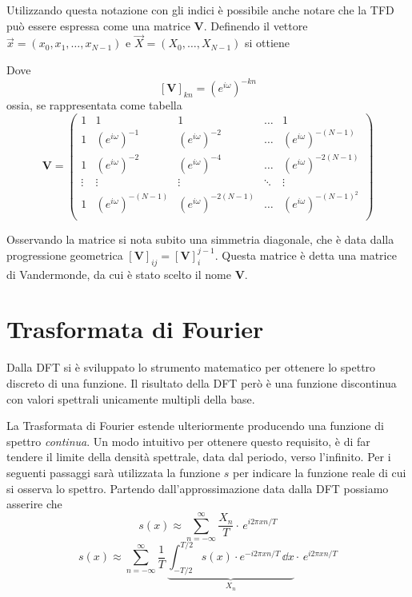 \noindent\fbox{\begin{minipage}{\textwidth}\[
    X_k = c_k \cdot T = \sum_{n=0}^{N-1} x_n\cdot e^{-i\omega kn}
\]\end{minipage}}

Utilizzando questa notazione con gli indici \`e possibile anche notare che la
TFD pu\`o essere espressa come una matrice \(\mathbf{V}\). Definendo il vettore
\(\vec{x} = (x_0,x_1,\dots,x_{N-1})\) e \(\vec{X} = (X_0,\dots,X_{N-1})\) si ottiene

\noindent\fbox{\begin{minipage}{\textwidth}\[
    \vec{X} = \mathbf{V}\cdot\vec{x}
    \vspace{2mm}
\]\end{minipage}}

\noindent Dove 
\[
    [\mathbf{V}]_{kn} = (e^{i\omega})^{-kn}
\]
ossia, se rappresentata come tabella
\[
    \mathbf{V} = 
    \begin{pmatrix}
    1      & 1                      & 1                       & \dots  & 1                        \\[1em]
    1      & (e^{i\omega})^{-1}     & (e^{i\omega})^{-2}      & \dots  & (e^{i\omega})^{-(N-1)}   \\[1em]
    1      & (e^{i\omega})^{-2}     & (e^{i\omega})^{-4}      & \dots  & (e^{i\omega})^{-2(N-1)}  \\[1em]
    \vdots & \vdots                 &  \vdots                 & \ddots & \vdots                   \\[1em]
    1      & (e^{i\omega})^{-(N-1)} & (e^{i\omega})^{-2(N-1)} & \dots  & (e^{i\omega})^{-(N-1)^2} \\[1em]
    \end{pmatrix}
\]

Osservando la matrice si nota subito una simmetria diagonale, che \`e data
dalla  progressione geometrica \([\mathbf{V}]_{ij} = [\mathbf{V}]_i^{j-1}\).
Questa matrice \`e detta una matrice di Vandermonde, da cui \`e stato scelto
il nome \(\mathbf{V}\).

\section{Trasformata di Fourier}
Dalla DFT si \`e sviluppato lo strumento matematico per ottenere lo spettro
discreto di una funzione. Il risultato della DFT per\`o \`e una funzione
discontinua con valori spettrali unicamente multipli della base.

La Trasformata di Fourier estende ulteriormente producendo una funzione di
spettro \emph{continua}.  Un modo intuitivo per ottenere questo requisito, \`e
di far tendere il limite della densit\`a spettrale, data dal periodo, verso
l'infinito.  Per i seguenti passaggi sar\`a utilizzata la funzione \(s\) per
indicare la funzione reale di cui si osserva lo spettro. Partendo
dall'approssimazione data dalla DFT possiamo asserire che
\[
    s(x) \approx \sum_{n=-\infty}^\infty \frac{X_n}{T}
        \cdot\,e^{i2\pi xn/T}
\]
\[
    s(x) \approx \sum_{n=-\infty}^\infty
        \frac{1}{T}\,
        \underbrace{
            \int_{-T/2}^{T/2} s(x)\cdot e^{-i2\pi xn/T}\,\dd{x}
        }_{X_n}
        \cdot\,e^{i2\pi xn/T}
\]


